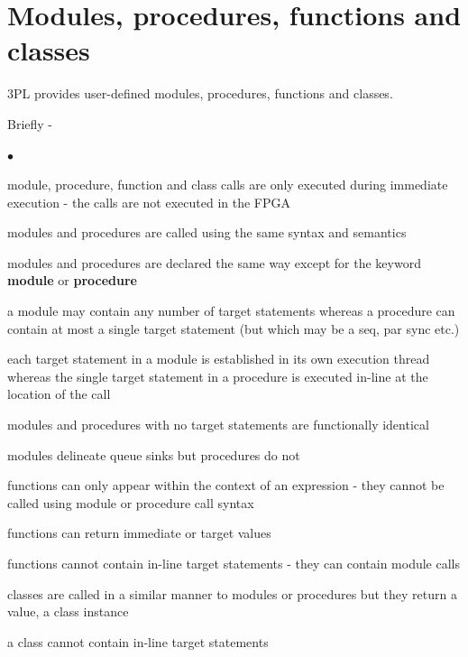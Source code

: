 \documentclass[10pt,a4paper,twoside,fleqn]{article}
\newcommand{\blist}{\begin{list}{$\bullet$}{\setlength{\itemsep}{-5pt}\setlength{\topsep}{-5pt}}}
\newcommand{\blend}{\end{list}}
\begin{document}
\section{Modules, procedures, functions and classes}

    3PL provides user-defined modules, procedures, functions and classes.

    Briefly -
    \blist
    \item   module, procedure, function and class calls are only executed during
            immediate execution - the calls are not executed in the FPGA
    \item   modules and procedures are called using the same syntax and semantics
    \item   modules and procedures are declared the same way except for the
            keyword {\bf module} or {\bf procedure}
    \item   a module may contain any number of target statements whereas a
            procedure can contain at most a single target statement (but which
            may be a seq, par sync etc.)
    \item   each target statement in a module is established in its own
            execution thread whereas the single target statement in a procedure
            is executed in-line at the location of the call
    \item   modules and procedures with no target statements are functionally
            identical
    \item   modules delineate queue sinks but procedures do not
    \item   functions can only appear within the context of an expression -
            they cannot be called using module or procedure call syntax
    \item   functions can return immediate or target values
    \item   functions cannot contain in-line target statements - they can
            contain module calls
    \item   classes are called in a similar manner to modules or procedures but
            they return a value, a class instance
    \item   a class cannot contain in-line target statements
    \blend
    
\end{document}
